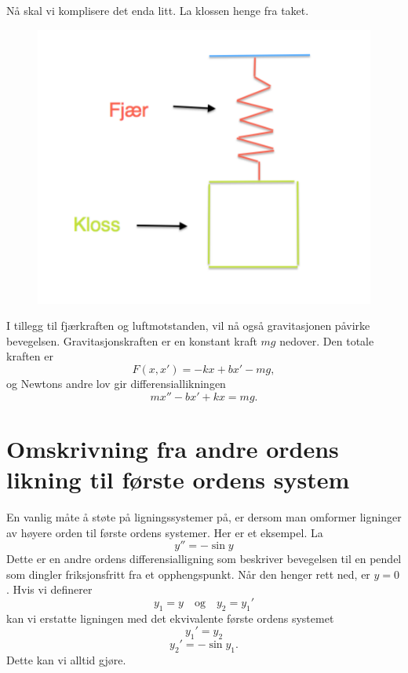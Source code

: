 N{\aa} skal vi komplisere det enda litt. La klossen henge fra taket.
\begin{figure}[htbp]
  \begin{center}
	\includegraphics[scale=.4]{Hooke_2.pdf}
	\label{fig:Num1}
	\end{center}
\end{figure}
I tillegg til fj{\ae}rkraften og luftmotstanden, vil n{\aa} ogs{\aa} gravitasjonen p{\aa}virke bevegelsen. Gravitasjonskraften er en konstant kraft $mg$ nedover. Den totale kraften
er
\begin{equation*}
F(x,x')=-kx+bx'-mg,
\end{equation*}
og Newtons andre lov gir differensiallikningen
\begin{equation*}
mx''-bx' +kx=mg.
\end{equation*}





\section*{Omskrivning fra andre ordens likning til første ordens system}
En vanlig m{\aa}te {\aa} st{\o}te p{\aa} ligningssystemer p{\aa}, er dersom man omformer ligninger av h{\o}yere orden til f{\o}rste ordens systemer. Her er et eksempel. La 
\begin{equation*}
y''=-\sin y
\end{equation*}
Dette er en andre ordens differensialligning som beskriver bevegelsen til en pendel som dingler friksjonsfritt fra et opphengspunkt. N{\aa}r den henger rett ned, er $y=0$. Hvis vi
definerer
\begin{equation*}
y_{1}=y \quad \text{og} \quad y_{2}=y_{1}'
\end{equation*}
kan vi erstatte ligningen med det ekvivalente f{\o}rste ordens systemet
\begin{equation*}
y_{1}'=y_{2}
\end{equation*}
\begin{equation*}
y_{2}'=-\sin y_{1}.
\end{equation*}
Dette kan vi alltid gj{\o}re.


